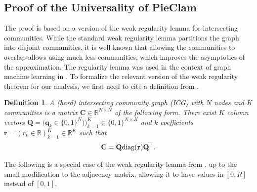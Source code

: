 \documentclass[letterpaper]{article} %
\newtheorem{definition}[theorem]{Definition}
\newcommand{\ron}[1]{{{\textcolor{red}{\textbf{[Ron:} {#1}\textbf{]}}}}}
\begin{document}
\subsection{Proof of the Universality of PieClam}
\label{Proof of the Universality of PieClam}

The proof is based on a version of the weak regularity lemma for intersecting communities. While the standard weak regularity lemma \cite{weakReg,Szemeredi_analyst} partitions the graph into disjoint communities, it is well known that allowing the communities to overlap allows using much less communities, which improves the asymptotics of the approximation. The regularity lemma was used in the context of graph machine learning in \cite{Levie_reg_23,Levie_intersecting_reg_24}. To formalize the relevant version of the weak regularity theorem for our analysis, we first need to cite a definition from \cite{Levie_intersecting_reg_24}.

\begin{definition}
    A (hard) intersecting community graph (ICG) with $N$ nodes and  $K$ communities is a matrix $\mathbf{C}\in\mathbb{R}^{N\times N}$ of the following form. There exist $K$ column vectors $\mathbf{Q}=\big(\mathbf{q}_k\in\{0,1\}^N\big))_{k=1}^K\in \{0,1\}^{N\times K}$ and $k$ coefficients $\mathbf{r}=(r_k\in\mathbb{R})_{k=1}^K\in\mathbb{R}^K$ such that
    \[\mathbf{C}= \mathbf{Q}{\rm diag}(\mathbf{r})\mathbf{Q}^{\top }.\]
\end{definition}




The following is a special case of the weak regularity lemma from \cite{Levie_intersecting_reg_24}, up to the small modification to the adjacency matrix, allowing it to have values in $[0,R]$ instead of $[0,1]$. %
\end{document}
